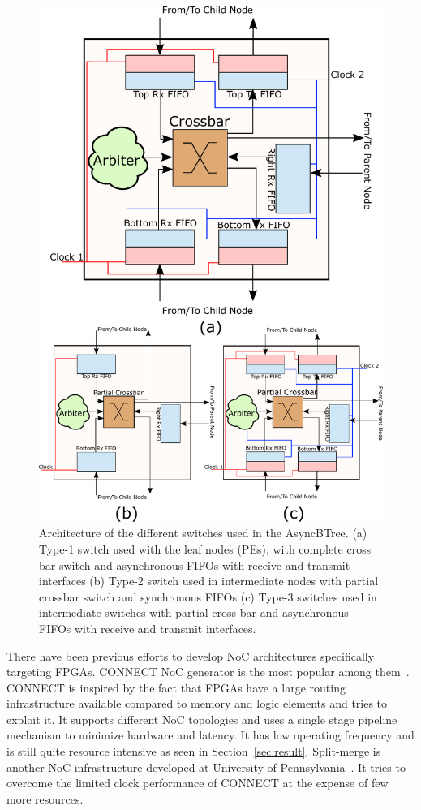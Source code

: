 \begin{figure}[t]
\centering
   \includegraphics[width=\columnwidth]{Figures/switch1_2.pdf}
   \caption{Architecture of the different switches used in the AsyncBTree. (a) Type-1 switch used with the leaf nodes (PEs), with complete cross bar switch and asynchronous 
   FIFOs with receive and transmit interfaces (b) Type-2 switch used in intermediate nodes with partial crossbar switch and synchronous FIFOs (c) Type-3 switches used in intermediate
   switches with partial cross bar and asynchronous FIFOs with receive and transmit interfaces.}
   \label{fig:switchArch}
\end{figure}

There have been previous efforts to develop NoC architectures specifically targeting FPGAs.
CONNECT NoC generator is the most popular among them~\cite{papa_connect_fpga2012}.
CONNECT is inspired by the fact that FPGAs have a large routing infrastructure available compared to memory and logic elements and tries to exploit it. 
It supports different NoC topologies and uses a single stage pipeline mechanism  to minimize hardware and latency. 
It has low operating frequency and is still quite resource intensive as seen in Section~\ref{sec:result}. 
Split-merge is another NoC infrastructure developed at University of Pennsylvania~\cite{Huan2012}.
It tries to overcome the limited clock performance of CONNECT at the expense of few more resources.


